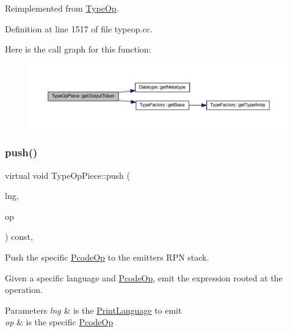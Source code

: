 Reimplemented from \mbox{\hyperlink{class_type_op_a7150ac93bb03a993735c829deb5237e7}{Type\+Op}}.



Definition at line 1517 of file typeop.\+cc.

Here is the call graph for this function\+:
\nopagebreak
\begin{figure}[H]
\begin{center}
\leavevmode
\includegraphics[width=350pt]{class_type_op_piece_a951c2e42be991699b04945bb1c71de04_cgraph}
\end{center}
\end{figure}
\mbox{\label{class_type_op_piece_a24c1187d1edbbd41aba854715f6c02fe}} 
\subsubsection{\texorpdfstring{push()}{push()}}
{\footnotesize\ttfamily virtual void Type\+Op\+Piece\+::push (\begin{DoxyParamCaption}\item[{\mbox{\hyperlink{class_print_language}{Print\+Language}} $\ast$}]{lng,  }\item[{const \mbox{\hyperlink{class_pcode_op}{Pcode\+Op}} $\ast$}]{op }\end{DoxyParamCaption}) const\hspace{0.3cm}{\ttfamily [inline]}, {\ttfamily [virtual]}}



Push the specific \mbox{\hyperlink{class_pcode_op}{Pcode\+Op}} to the emitter\textquotesingle{}s R\+PN stack. 

Given a specific language and \mbox{\hyperlink{class_pcode_op}{Pcode\+Op}}, emit the expression rooted at the operation. 
\begin{DoxyParams}{Parameters}
{\em lng} & is the \mbox{\hyperlink{class_print_language}{Print\+Language}} to emit \\
\hline
{\em op} & is the specific \mbox{\hyperlink{class_pcode_op}{Pcode\+Op}} \\
\hline
\end{DoxyParams}



